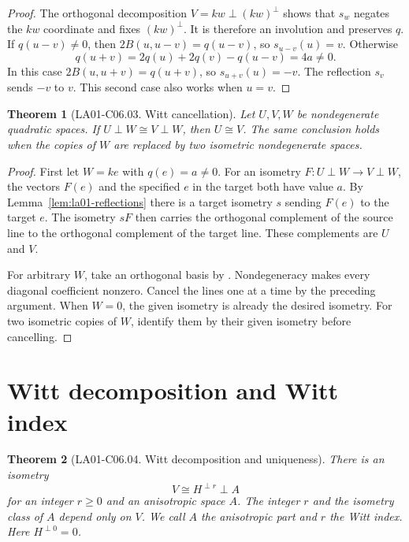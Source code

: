 \documentclass[11pt,oneside,openany]{book}
\newtheorem{theorem}{Theorem}[chapter]
\theoremstyle{definition}
\theoremstyle{remark}
\begin{document}
\begin{proof}
The orthogonal decomposition \(V=kw\perp(kw)^\perp\) shows
that \(s_w\) negates the \(kw\) coordinate and fixes
\((kw)^\perp\). It is therefore an involution and preserves \(q\).
If \(q(u-v)\ne 0\), then \(2B(u,u-v)=q(u-v)\), so
\(s_{u-v}(u)=v\). Otherwise
\[
  q(u+v)=2q(u)+2q(v)-q(u-v)=4a\ne 0.
\]
In this case \(2B(u,u+v)=q(u+v)\), so \(s_{u+v}(u)=-v\).
The reflection \(s_v\) sends \(-v\) to \(v\). This second case
also works when \(u=v\).
\end{proof}

\begin{theorem}[LA01-C06.03. Witt cancellation]
\label{thm:la01-witt-cancellation}
Let \(U,V,W\) be nondegenerate quadratic spaces. If
\(U\perp W\cong V\perp W\), then \(U\cong V\).
The same conclusion holds when the copies of \(W\) are
replaced by two isometric nondegenerate spaces.
\end{theorem}

\begin{proof}
First let \(W=ke\) with \(q(e)=a\ne 0\). For an isometry
\(F:U\perp W\to V\perp W\), the vectors \(F(e)\) and the
specified \(e\) in the target both have value \(a\).
By Lemma~\ref{lem:la01-reflections} there is a target isometry
\(s\) sending \(F(e)\) to the target \(e\). The isometry \(sF\)
then carries the orthogonal complement of the source line to
the orthogonal complement of the target line. These
complements are \(U\) and \(V\).

For arbitrary \(W\), take an orthogonal basis by
\cite[11.diagonal\_congruence]{d05}. Nondegeneracy makes every
diagonal coefficient nonzero. Cancel the lines one at a time
by the preceding argument. When \(W=0\), the given isometry is
already the desired isometry. For two isometric copies of
\(W\), identify them by their given isometry before cancelling.
\end{proof}

\section{Witt decomposition and Witt index}

\begin{theorem}[LA01-C06.04. Witt decomposition and uniqueness]
\label{thm:la01-witt-decomposition}
There is an isometry
\[
  V\cong H^{\perp r}\perp A
\]
for an integer \(r\ge 0\) and an anisotropic space \(A\). The
integer \(r\) and the isometry class of \(A\) depend only on \(V\).
We call \(A\) the anisotropic part and \(r\) the Witt index.
Here \(H^{\perp 0}=0\).
\end{theorem}
\end{document}
